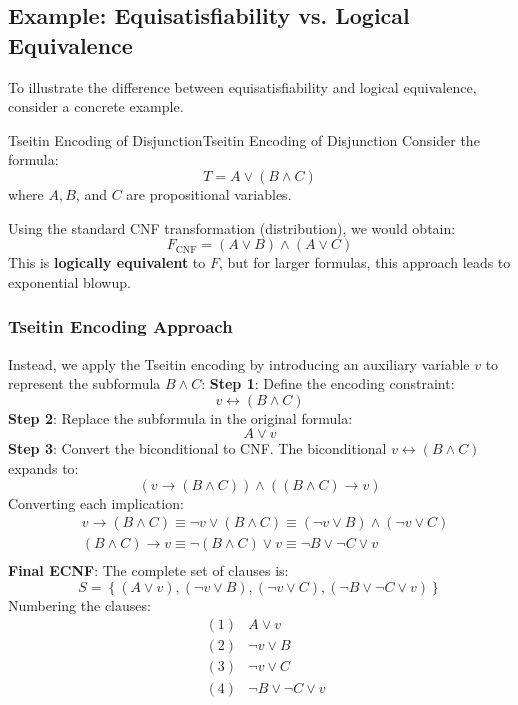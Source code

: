 \documentclass[a4paper]{article}
\theoremstyle{definition}
\begin{document}
\subsection{Example: Equisatisfiability vs. Logical Equivalence}
To illustrate the difference between equisatisfiability and logical equivalence, consider a concrete example.
\begin{example}{Tseitin Encoding of Disjunction}{Tseitin Encoding of Disjunction}
Consider the formula:
\[
  T = A \vee (B \wedge C)
\]
where \( A, B \), and \( C \) are propositional variables.
\end{example}
Using the standard CNF transformation (distribution), we would obtain:
\[
  F_{\text{CNF}} = (A \vee B) \wedge (A \vee C)
\]
This is \textbf{logically equivalent} to \( F \), but for larger formulas, this approach leads to exponential blowup.
\subsubsection{Tseitin Encoding Approach}
Instead, we apply the Tseitin encoding by introducing an auxiliary variable \( v \) to represent the subformula \( B \wedge C \):
\vspace{1em}
\noindent
\newline 
\textbf{Step 1}: Define the encoding constraint:
\[
  v \leftrightarrow (B \wedge C)
\]
\textbf{Step 2}: Replace the subformula in the original formula:
\[
  A \vee v 
\]
\textbf{Step 3}: Convert the biconditional to CNF. The biconditional \( v \leftrightarrow (B \wedge C) \) expands to:
\[
  (v \rightarrow (B \wedge C)) \wedge ((B \wedge C) \rightarrow v) 
\]
Converting each implication:
\begin{align*}
    & v \rightarrow (B \wedge C) \equiv \lnot v \vee (B \wedge C) \equiv (\lnot v \vee B) \wedge (\lnot v \vee C) \\
    & (B \wedge C) \rightarrow v \equiv \lnot(B \wedge C) \vee v \equiv \lnot B \vee \lnot C \vee v \\
\end{align*}
\textbf{Final ECNF}: The complete set of clauses is:
\[
  S = \left\{(A \vee v), (\lnot v \vee B), (\lnot v \vee C), (\lnot B \vee \lnot C \vee v) \right\}
\]
Numbering the clauses:
\begin{align*}
    & (1) & A \vee v \\
    & (2) & \lnot v \vee B \\
    & (3) & \lnot v \vee C \\
    & (4) & \lnot B \vee \lnot C \vee v \\
\end{align*}
\end{document}

